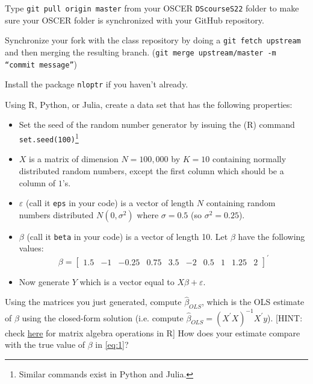 \documentclass[12pt,english]{exam}
\begin{document}
\begin{questions}
\question Type \texttt{git pull origin master} from your OSCER \texttt{DScourseS22} folder to make sure your OSCER folder is synchronized with your GitHub repository. 

\question Synchronize your fork with the class repository by doing a \texttt{git fetch upstream} and then merging the resulting branch. (\texttt{git merge upstream/master -m ``commit message''})

\question Install the package \texttt{nloptr} if you haven't already.

\question Using R, Python, or Julia, create a data set that has the following properties:
\begin{itemize}
    \item Set the seed of the random number generator by issuing the (R) command \texttt{set.seed(100)}\footnote{Similar commands exist in Python and Julia.}
    \item $X$ is a matrix of dimension $N=100,000$ by $K=10$ containing normally distributed random numbers, except the first column which should be a column of $1$'s. 
    \item $\varepsilon$ (call it \texttt{eps} in your code) is a vector of length $N$ containing random numbers distributed $N\left(0,\sigma^{2}\right)$ where $\sigma=0.5$ (so $\sigma^{2} = 0.25$).
    \item $\beta$ (call it \texttt{beta} in your code) is a vector of length 10. Let $\beta$ have the following values:
        \begin{equation}
            \label{eq:1}
           \beta = \left[\begin{array}{cccccccccc}
            1.5 & -1 & -0.25 & 0.75 & 3.5 & -2 & 0.5 & 1 & 1.25 & 2
            \end{array}\right]^{\prime}
        \end{equation}
    \item Now generate $Y$ which is a vector equal to $X\beta + \varepsilon$.
\end{itemize}

\question Using the matrices you just generated, compute $\hat{\beta}_{OLS}$, which is the OLS estimate of $\beta$ using the closed-form solution (i.e. compute $\hat{\beta}_{OLS} = \left(X^{\prime}X\right)^{-1}X^{\prime}y$). [HINT: check \href{https://www.statmethods.net/advstats/matrix.html}{here} for matrix algebra operations in R] How does your estimate compare with the true value of $\beta$ in \eqref{eq:1}?


\end{questions}
\end{document}
